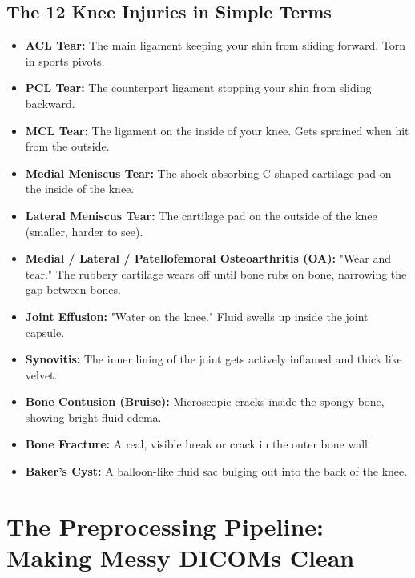 \documentclass[11pt,a4paper]{article}
\begin{document}
\subsection{The 12 Knee Injuries in Simple Terms}
\begin{itemize}[leftmargin=*,noitemsep]
    \item \textbf{ACL Tear:} The main ligament keeping your shin from sliding forward. Torn in sports pivots.
    \item \textbf{PCL Tear:} The counterpart ligament stopping your shin from sliding backward.
    \item \textbf{MCL Tear:} The ligament on the inside of your knee. Gets sprained when hit from the outside.
    \item \textbf{Medial Meniscus Tear:} The shock-absorbing C-shaped cartilage pad on the inside of the knee.
    \item \textbf{Lateral Meniscus Tear:} The cartilage pad on the outside of the knee (smaller, harder to see).
    \item \textbf{Medial / Lateral / Patellofemoral Osteoarthritis (OA):} "Wear and tear." The rubbery cartilage wears off until bone rubs on bone, narrowing the gap between bones.
    \item \textbf{Joint Effusion:} "Water on the knee." Fluid swells up inside the joint capsule.
    \item \textbf{Synovitis:} The inner lining of the joint gets actively inflamed and thick like velvet.
    \item \textbf{Bone Contusion (Bruise):} Microscopic cracks inside the spongy bone, showing bright fluid edema.
    \item \textbf{Bone Fracture:} A real, visible break or crack in the outer bone wall.
    \item \textbf{Baker's Cyst:} A balloon-like fluid sac bulging out into the back of the knee.
\end{itemize}

\newpage

\section{The Preprocessing Pipeline: Making Messy DICOMs Clean}
\end{document}
